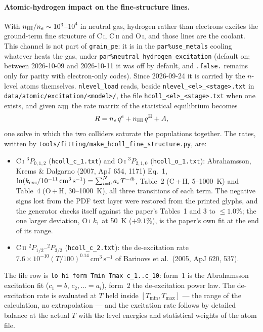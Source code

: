 \documentclass[english,a4paper]{my_memo}
\newcommand{\code}[1]{\texttt{#1}}
\newcommand{\cmc}{\mathrm{cm^{3}\,s^{-1}}}
\begin{document}
\paragraph{Atomic-hydrogen impact on the fine-structure lines.}  With
$n_{\rm HI}/n_e \sim 10^3$--$10^4$ in neutral gas, hydrogen rather than
electrons excites the ground-term fine structure of C\,\textsc{i},
C\,\textsc{ii} and O\,\textsc{i}, and those lines are the coolant.  This
channel is not part of \code{grain\_pe}: it is in the
\code{par\%use\_metals} cooling whatever heats the gas, under
\code{par\%neutral\_hydrogen\_excitation} (default on; between 2026-10-09
and 2026-10-11 it was off by default, and \code{.false.} remains only for
parity with electron-only codes).  Since 2026-09-24 it is carried by the
$n$-level atoms themselves.  \code{nlevel\_load} reads, beside
\code{nlevel\_<el>\_<stage>.txt} in \code{data/atomic/excitation/<model>/},
the file \code{hcoll\_<el>\_<stage>.txt} when one exists, and given $n_{\rm HI}$ the rate matrix of the statistical
equilibrium becomes
\begin{equation}
  R = n_e\,q^e + n_{\rm HI}\,q^{\rm H} + A,
\end{equation}
one solve in which the two colliders saturate the populations together.
The rates, written by
\code{tools/\allowbreak fitting/\allowbreak make\_hcoll\_fine\_structure.py}, are:
\begin{itemize}
\item C\,\textsc{i} $^3P_{0,1,2}$ (\code{hcoll\_c\_1.txt}) and
  O\,\textsc{i} $^3P_{2,1,0}$ (\code{hcoll\_o\_1.txt}): Abrahamsson, Krems
  \& Dalgarno (2007, ApJ 654, 1171) Eq.~1,
  $\ln(k_{\rm exc}/10^{-11}\,\cmc) = \sum_{i=0}^{N} a_i\,T^{-ib}$, Table~2
  (C\,+\,H, 5--1000~K) and Table~4 (O\,+\,H, 30--1000~K), all three
  transitions of each term.  The negative signs lost from the PDF text layer
  were restored from the printed glyphs, and the generator checks itself
  against the paper's Tables~1 and 3 to $\le 1.0\%$; the one larger
  deviation, O\,\textsc{i} $k_1$ at 50~K ($+9.1\%$), is the paper's own fit
  at the end of its range.
\item C\,\textsc{ii} $^2P_{1/2}$--$^2P_{3/2}$ (\code{hcoll\_c\_2.txt}):
  the de-excitation rate $7.6{\times}10^{-10}(T/100)^{0.14}\,\cmc$ of
  Barinovs et al.\ (2005, ApJ 620, 537).
\end{itemize}
The file row is \code{lo hi form Tmin Tmax c\_1..c\_10}: form~1 is the
Abrahamsson excitation fit ($c_1 = b$, $c_2, \ldots = a_i$), form~2 the
de-excitation power law.  The de-excitation rate is evaluated at $T$ held
inside $[T_{\min}, T_{\max}]$ --- the range of the calculation, no
extrapolation --- and the excitation rate follows by detailed balance at the
actual $T$ with the level energies and statistical weights of the atom
file.
\end{document}
